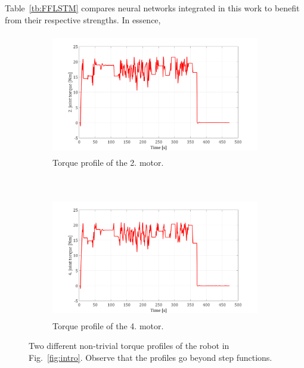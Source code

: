\documentclass{ifacconf}
\begin{document}
Table~\ref{tb:FFLSTM} compares  neural networks integrated in this work to benefit from their respective strengths. In essence,
\begin{table}[b!]
  \begin{center}
  \caption{Comparison between Feedforward and LSTM neural networks}\label{tb:FFLSTM}
  \end{center}
\end{table}

\begin{figure}[t!]
	\centering
	\begin{subfigure}[b]{1.\columnwidth}
		\centering
		\includegraphics[height=2.1in]{./pictures/applications/T2.png}
		\caption{Torque profile of the 2. motor.}
	\end{subfigure}%
	~ 
	\begin{subfigure}[b]{1.\columnwidth}
		\centering
		\includegraphics[height=2.1in]{./pictures/applications/T4.png}
		\caption{Torque profile of the 4. motor.}
	\end{subfigure}
	\caption{Two different non-trivial  torque profiles of the robot in Fig.~\ref{fig:intro}. Observe that the profiles go beyond step functions. }
	\label{jointtorque}
\end{figure}
\end{document}
